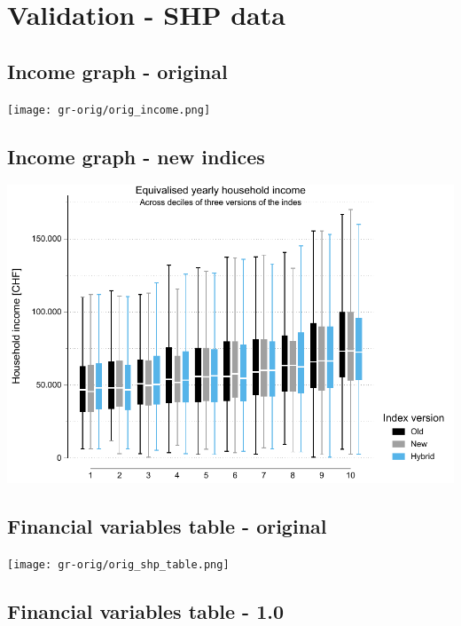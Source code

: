 \documentclass[a4paper, notitlepage, fleqn]{article} %
\begin{document}
\newpage
\section{Validation - SHP data}

\subsection{Income graph - original}

\begin{center}
\texttt{[image: gr-orig/orig\_income.png]} 
\end{center}

\subsection{Income graph - new indices}
\begin{center}
\includegraphics[width=.75\textwidth]{gr/shp_income.pdf} 
\end{center}

\newpage
\subsection{Financial variables table - original}

\begin{center}
\texttt{[image: gr-orig/orig\_shp\_table.png]} 
\end{center}

\newpage
\subsection{Financial variables table - 1.0}
\begin{stlog}\end{stlog}
\newpage
\begin{stlog}\end{stlog}
\newpage
\begin{stlog}\end{stlog}
\newpage
\end{document}
